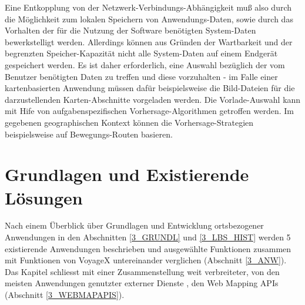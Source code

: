\vspace{2ex}
\enlargethispage{3\baselineskip} %
\noindent
Eine Entkopplung von der Netzwerk-Verbindungs-Abhängigkeit muß also durch die Möglichkeit zum lokalen Speichern von Anwendungs-Daten, sowie durch das Vorhalten der für die Nutzung der Software benötigten System-Daten bewerkstelligt werden. Allerdings können aus Gründen der Wartbarkeit und der begrenzten Speicher-Kapazität nicht alle System-Daten auf einem Endgerät gespeichert werden. Es ist daher erforderlich, eine Auswahl bezüglich der vom Benutzer benötigten Daten zu treffen und diese vorzuhalten - im Falle einer kartenbasierten Anwendung müssen dafür beispielsweise die Bild-Dateien für die darzustellenden Karten-Abschnitte vorgeladen werden. Die Vorlade-Auswahl kann mit Hife von aufgabenspezifischen Vorhersage-Algorithmen getroffen werden. Im gegebenen geographischen Kontext können die Vorhersage-Strategien beispielsweise auf Bewegungs-Routen basieren. 


\newpage
%
%
\section{Grundlagen und Existierende Lösungen}
Nach einem Überblick über Grundlagen und Entwicklung ortsbezogener Anwendungen in den Abschnitten \ref{3_GRUNDL} und \ref{3_LBS_HIST} werden 5 existierende Anwendungen beschrieben und ausgewählte Funktionen zusammen mit Funktionen von VoyageX untereinander verglichen (Abschnitt \ref{3_ANW}). Das Kapitel schliesst mit einer Zusammenstellung weit verbreiteter, von den meisten Anwendungen genutzter externer Dienste%
, den Web Mapping APIs (Abschnitt \ref{3_WEBMAPAPIS}).

